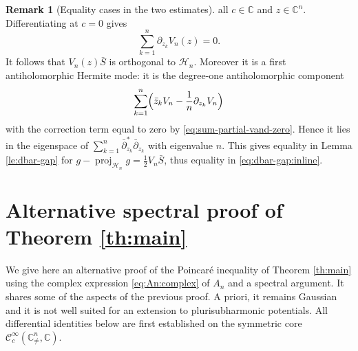 \documentclass[11pt,reqno]{amsart}
\numberwithin{equation}{section}%
\numberwithin{figure}{section}%
\numberwithin{table}{section}
\theoremstyle{plain}
\theoremstyle{definition}
\newtheorem{remark}[theorem]{Remark}
\begin{document}
\begin{remark}[Equality cases in the two estimates]
  all $c\in\mathbb{C}$ and $z\in\mathbb{C}^n$. Differentiating at $c=0$ gives
  \begin{equation}\label{eq:sum-partial-vand-zero}
    \sum_{k=1}^n\partial_{z_k}V_n(z)=0.
  \end{equation}
  It follows that $V_n(z)\bar{S}$ is orthogonal to $\mathcal{H}_n$. Moreover
  it is a first antiholomorphic Hermite mode: it is the degree-one
  antiholomorphic component
  \begin{equation}\label{eq:first-antiholomorphic-mode}
    \sum_{k=1}^n\Bigl(\bar{z}_kV_n-\frac{1}{n}\partial_{z_k}V_n\Bigr)
  \end{equation}
  with the correction term equal to zero by \eqref{eq:sum-partial-vand-zero}.
  Hence it lies in the eigenspace of
  $\sum_{k=1}^n\bar\partial_{z_k}^*\bar\partial_{z_k}$ with eigenvalue $n$. This gives
  equality in Lemma \ref{le:dbar-gap} for
  $g-\operatorname{proj}_{\mathcal{H}_n}g=\frac{1}{2}V_n\bar{S}$, thus equality in \eqref{eq:dbar-gap:inline}.
\end{remark}

\section{Alternative spectral proof of Theorem \ref{th:main}}
\label{se:proof:th:main:spectral}

We give here an alternative proof of the Poincaré inequality of Theorem
\ref{th:main} using the complex expression \eqref{eq:An:complex} of $A_n$ and
a spectral argument. It shares some of the aspects of the previous proof. A
priori, it remains Gaussian and it is not well suited for an extension to
plurisubharmonic potentials. All differential identities below are first
established on the symmetric core
$\mathcal{C}_c^\infty(\mathbb{C}^n_{\neq},\mathbb{C})$.
\end{document}
